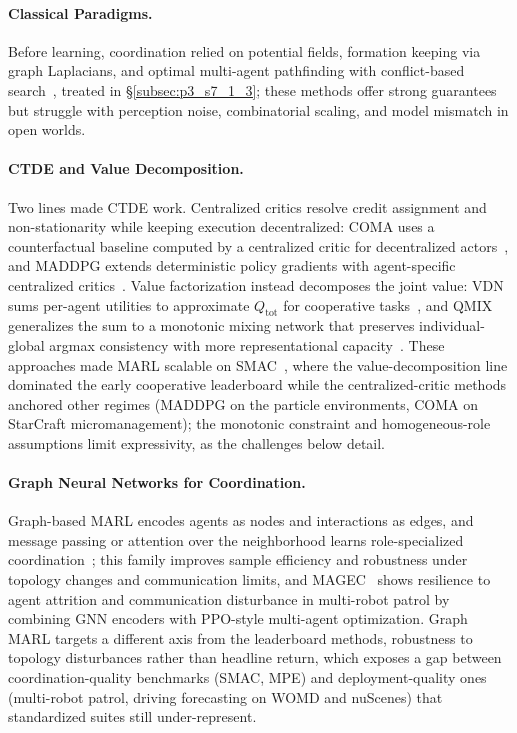 \paragraph{Classical Paradigms.}
Before learning, coordination relied on potential fields, formation keeping via graph Laplacians, and optimal multi-agent pathfinding with conflict-based search~\cite{Sharon2015CBS}, treated in §\ref{subsec:p3_s7_1_3}; these methods offer strong guarantees but struggle with perception noise, combinatorial scaling, and model mismatch in open worlds.

\paragraph{CTDE and Value Decomposition.}
Two lines made CTDE work.
Centralized critics resolve credit assignment and non-stationarity while keeping execution decentralized: COMA uses a counterfactual baseline computed by a centralized critic for decentralized actors~\cite{foerster2018coma}, and MADDPG extends deterministic policy gradients with agent-specific centralized critics~\cite{lowe2017maddpg}.
Value factorization instead decomposes the joint value: VDN sums per-agent utilities to approximate $Q_{\text{tot}}$ for cooperative tasks~\cite{sunehag2018vdn}, and QMIX generalizes the sum to a monotonic mixing network that preserves individual-global argmax consistency with more representational capacity~\cite{rashid2018qmix}.
These approaches made MARL scalable on SMAC~\cite{samvelyan2019smac}, where the value-decomposition line dominated the early cooperative leaderboard while the centralized-critic methods anchored other regimes (MADDPG on the particle environments, COMA on StarCraft micromanagement); the monotonic constraint and homogeneous-role assumptions limit expressivity, as the challenges below detail.

\paragraph{Graph Neural Networks for Coordination.}
Graph-based MARL encodes agents as nodes and interactions as edges, and message passing or attention over the neighborhood learns role-specialized coordination~\cite{jiang2018gcrl}; this family improves sample efficiency and robustness under topology changes and communication limits, and MAGEC~\cite{goeckner2024magec} shows resilience to agent attrition and communication disturbance in multi-robot patrol by combining GNN encoders with PPO-style multi-agent optimization.
Graph MARL targets a different axis from the leaderboard methods, robustness to topology disturbances rather than headline return, which exposes a gap between coordination-quality benchmarks (SMAC, MPE) and deployment-quality ones (multi-robot patrol, driving forecasting on WOMD and nuScenes) that standardized suites still under-represent.

